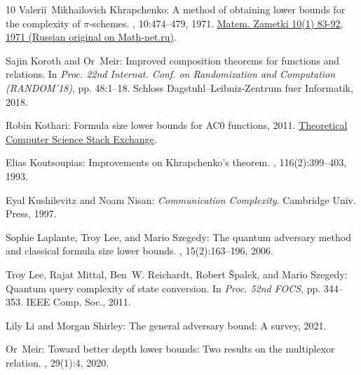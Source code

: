 \begin{thebibliography}{10}
{\sc Valerii~Mikhailovich Khrapchenko}: A method of obtaining lower bounds for
  the complexity of {$\pi$}-schemes.
,
  10:474--479, 1971.
\newblock \href{https://mi.mathnet.ru/mzm7071}{Matem. Zametki 10(1) 83-92, 1971
  (Russian original on Math-net.ru)}.
\newblock [\epfmtdoi{10.1007/BF01747074}]

{\sc Sajin Koroth and Or~Meir}: Improved composition theorems for functions and
  relations.
\newblock In {\em Proc. 22nd Internat. Conf. on Randomization and Computation
  (RANDOM'18)}, pp. 48:1--18. Schloss Dagstuhl--Leibniz-Zentrum fuer
  Informatik, 2018.

{\sc Robin Kothari}: Formula size lower bounds for {AC0} functions, 2011.
\newblock
  \href{https://cstheory.stackexchange.com/questions/7156/formula-size-lower-bounds-for-ac0-functions}{Theoretical
  Computer Science Stack Exchange}.

{\sc Elias Koutsoupias}: Improvements on {Khrapchenko}'s theorem.
, 116(2):399--403, 1993.
\newblock [\epfmtdoi{10.1016/0304-3975(93)90330-V}]

{\sc Eyal Kushilevitz and Noam Nisan}: {\em Communication Complexity}.
\newblock Cambridge Univ. Press, 1997.
\newblock [\epfmtdoi{10.1017/9781108671644}]

{\sc Sophie Laplante, Troy Lee, and Mario Szegedy}: The quantum adversary
  method and classical formula size lower bounds.
, 15(2):163--196, 2006.
\newblock [\epfmtdoi{10.1007/s00037-006-0212-7}]

{\sc Troy Lee, Rajat Mittal, Ben~W. Reichardt, Robert {\v{S}}palek, and Mario
  Szegedy}: Quantum query complexity of state conversion.
\newblock In {\em Proc. 52nd FOCS}, pp. 344--353. IEEE Comp. Soc., 2011.

{\sc Lily Li and Morgan Shirley}: The general adversary bound: A survey, 2021.

{\sc Or~Meir}: Toward better depth lower bounds: Two results on the multiplexor
  relation.
, 29(1):4, 2020.
\newblock [\epfmtdoi{10.1007/s00037-020-00194-8}]


\end{thebibliography}
